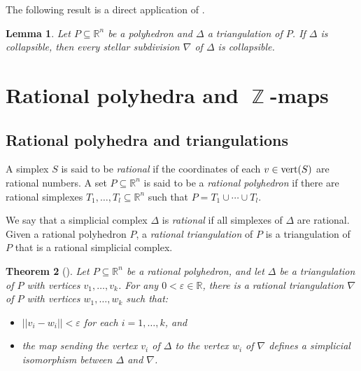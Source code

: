 \documentclass[reqno, draft]{amsart}
\newtheorem{theorem}{Theorem}[section]
\newtheorem{lemma}[theorem]{Lemma}
\theoremstyle{definition}
\begin{document}
The following result is a direct application of 
\cite[Theorem~4]{Whi1939}.

\begin{lemma}\label{Lem:BlowUpsPreserveCollapsible}
Let $P\subseteq{\mathbb{R}}^n$ be a polyhedron 
and $\Delta$ a triangulation of $P$. 
If $\Delta$ is collapsible, 
then every stellar subdivision $\nabla$  of $\Delta$ is collapsible.
\end{lemma}

\section{Rational polyhedra and $\operatorname{\mathbb{Z}}$-maps}

\subsection{Rational polyhedra and triangulations}\label{Sec:RatPol}

A simplex $S$  is said to be {\it rational} 
if the coordinates of each $v\in\operatorname{{\rm vert}}(S)$ are rational numbers.  
A set $P\subseteq {\mathbb{R}}^n$ is said to be a {\it rational polyhedron} 
if there are rational simplexes $T_{1},\ldots,T_{l}\subseteq{\mathbb{R}}^n$
such that $P=T_{1}\cup\cdots\cup T_{l}$. 

We say that a simplicial complex  $\Delta$ is {\it rational} 
if all simplexes of $\Delta$ are rational.
Given a rational polyhedron $P$,   a {\it rational triangulation}  
of $P$ is a triangulation of $P$ that is a rational simplicial complex.

\begin{theorem}[{\cite[Theorem 1]{Bey1977}}]
Let $P\subseteq {\mathbb{R}}^n$ be a rational polyhedron, 
and let $\Delta$ be a triangulation of $P$ with vertices 
$v_1,\ldots,v_k$. 
For any $0<\varepsilon \in{\mathbb{R}}$, 
there is a rational triangulation $\nabla$ of $P$
with vertices $w_1,\ldots,w_k$ such that:
\begin{itemize}
  \item[(i)] $||v_i -w_i|| < \varepsilon$ for each  $i = 1,\dots, k$, and
  \item[(ii)] the map sending the vertex $v_i$  of $\Delta$ 
     to the vertex $w_i$ of $\nabla$ defines a simplicial isomorphism 
     between $\Delta$ and $\nabla$.
\end{itemize}
\end{theorem}
\end{document}
